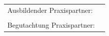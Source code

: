 \begin{titlepage}
	\vfill
	\vfill

	\begin{center}
		\begin{tabular}{ll}
		  Ausbildender Praxispartner:   & \myCompany\\
		                                & \myCompanyAddress\\
		  Begutachtung Praxispartner:   & \myExpert\\
		\end{tabular}
	\end{center} 


\end{titlepage}
\restoregeometry
\thispagestyle{empty}


%
%


